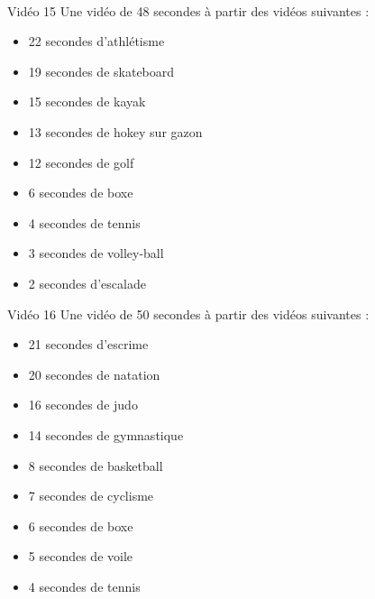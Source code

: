 \documentclass[10pt, a5paper,twoside]{article}
\begin{document}
\vfill

\clearpage
~
\vfill

\begin{card}[width = \textwidth, colback = olympicgreen, colframe = olympicgreen, bottomtitle = 2mm]{Vidéo 15}
  Une vidéo de 48 secondes à partir des vidéos suivantes :
  \vspace{-1mm}\begin{itemize}
    \item 22 secondes d'athlétisme
    \item 19 secondes de skateboard
    \item 15 secondes de kayak
    \item 13 secondes de hokey sur gazon
    \item 12 secondes de golf
    \item 6 secondes de boxe
    \item 4 secondes de tennis
    \item 3 secondes de volley-ball
    \item 2 secondes d'escalade
  \end{itemize}
\end{card}

\vfill

\begin{card}[width = \textwidth, colback = olympicgreen, colframe = olympicgreen, bottomtitle = 2mm]{Vidéo 16}
  Une vidéo de 50 secondes à partir des vidéos suivantes :
  \vspace{-1mm}\begin{itemize}
    \item 21 secondes d'escrime
    \item 20 secondes de natation
    \item 16 secondes de judo
    \item 14 secondes de gymnastique
    \item 8 secondes de basketball
    \item 7 secondes de cyclisme
    \item 6 secondes de boxe
    \item 5 secondes de voile
    \item 4 secondes de tennis
  \end{itemize}
\end{card}

\vfill

\clearpage
~
\vfill
\end{document}
